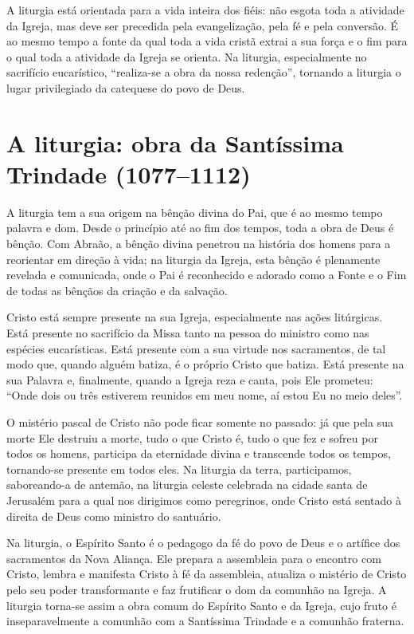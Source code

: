 A liturgia está orientada para a vida inteira dos fiéis: não esgota toda a atividade da Igreja, mas deve ser precedida pela evangelização, pela fé e pela conversão. É ao mesmo tempo a fonte da qual toda a vida cristã extrai a sua força e o fim para o qual toda a atividade da Igreja se orienta. Na liturgia, especialmente no sacrifício eucarístico, ``realiza-se a obra da nossa redenção'', tornando a liturgia o lugar privilegiado da catequese do povo de Deus.

\section{A liturgia: obra da Santíssima Trindade (1077--1112)}

A liturgia tem a sua origem na bênção divina do Pai, que é ao mesmo tempo palavra e dom. Desde o princípio até ao fim dos tempos, toda a obra de Deus é bênção. Com Abraão, a bênção divina penetrou na história dos homens para a reorientar em direção à vida; na liturgia da Igreja, esta bênção é plenamente revelada e comunicada, onde o Pai é reconhecido e adorado como a Fonte e o Fim de todas as bênçãos da criação e da salvação.

Cristo está sempre presente na sua Igreja, especialmente nas ações litúrgicas. Está presente no sacrifício da Missa tanto na pessoa do ministro como nas espécies eucarísticas. Está presente com a sua virtude nos sacramentos, de tal modo que, quando alguém batiza, é o próprio Cristo que batiza. Está presente na sua Palavra e, finalmente, quando a Igreja reza e canta, pois Ele prometeu: ``Onde dois ou três estiverem reunidos em meu nome, aí estou Eu no meio deles''.

O mistério pascal de Cristo não pode ficar somente no passado: já que pela sua morte Ele destruiu a morte, tudo o que Cristo é, tudo o que fez e sofreu por todos os homens, participa da eternidade divina e transcende todos os tempos, tornando-se presente em todos eles. Na liturgia da terra, participamos, saboreando-a de antemão, na liturgia celeste celebrada na cidade santa de Jerusalém para a qual nos dirigimos como peregrinos, onde Cristo está sentado à direita de Deus como ministro do santuário.

Na liturgia, o Espírito Santo é o pedagogo da fé do povo de Deus e o artífice dos sacramentos da Nova Aliança. Ele prepara a assembleia para o encontro com Cristo, lembra e manifesta Cristo à fé da assembleia, atualiza o mistério de Cristo pelo seu poder transformante e faz frutificar o dom da comunhão na Igreja. A liturgia torna-se assim a obra comum do Espírito Santo e da Igreja, cujo fruto é inseparavelmente a comunhão com a Santíssima Trindade e a comunhão fraterna.


